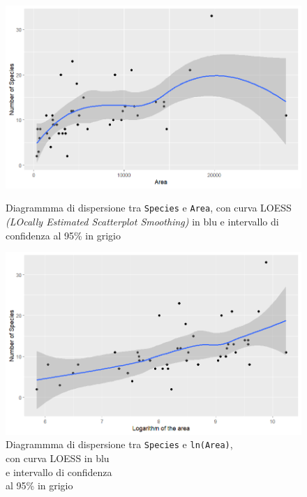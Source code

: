 \documentclass{article} %
\begin{document}
\begin{figure}[H]
    \centering
    \begin{minipage}{0.49\textwidth}
        \centering
        \includegraphics[width=\textwidth]{immagini/sp_a.png}
        \captionsetup{justification=centering}
        \caption{Diagrammma di dispersione tra \texttt{Species} e \texttt{Area}, con curva LOESS \textit{(LOcally Estimated Scatterplot Smoothing)} in blu e intervallo di confidenza al 95\% in grigio}
    \end{minipage}
    \hfill
    \begin{minipage}{0.49\textwidth}
        \centering
        \includegraphics[width=\textwidth]{immagini/sp_ln.png}
        \captionsetup{justification=centering}
        \caption{Diagrammma di dispersione tra \texttt{Species} e \texttt{ln(Area)}, \\con curva LOESS in blu \\e intervallo di confidenza \\al 95\% in grigio}
    \end{minipage}
\end{figure}
\end{document}
